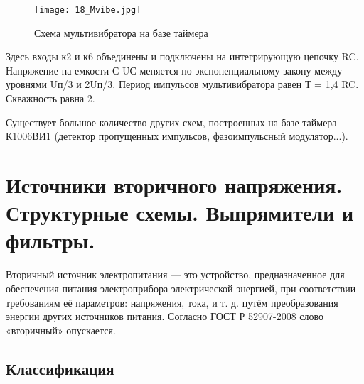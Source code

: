 \begin{figure}[H]
\centering
\texttt{[image: 18\_Mvibe.jpg]}
\caption{Схема мультивибратора на базе таймера}
\label{fig:18_Mvibe}
\end{figure}

Здесь входы к2 и к6 объединены и подключены на интегрирующую цепочку RC. Напряжение на емкости С UС меняется по экспоненциальному закону между уровнями Uп/3 и 2Uп/3. Период импульсов мультивибратора равен Т = 1,4 RC. Скважность равна 2.

Существует большое количество других схем, построенных на базе таймера К1006ВИ1 (детектор пропущенных импульсов, фазоимпульсный модулятор...).


\section{Источники вторичного напряжения. Структурные схемы. Выпрямители и фильтры.}

Вторичный источник электропитания --- это устройство, предназначенное для обеспечения питания электроприбора электрической энергией, при соответствии требованиям её параметров: напряжения, тока, и т. д. путём преобразования энергии других источников питания. Согласно ГОСТ Р 52907-2008 слово «вторичный» опускается.

\subsection*{Классификация}

